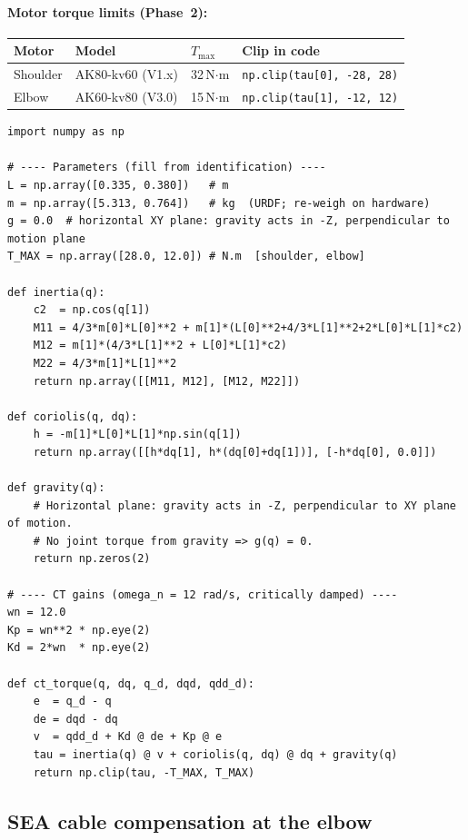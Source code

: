 \documentclass[11pt,a4paper]{article}
\begin{document}
\paragraph{Motor torque limits (Phase~2):}
\begin{center}\small
\begin{tabular}{llll}
\toprule
Motor & Model & $T_{\max}$ & Clip in code \\
\midrule
Shoulder & AK80-kv60 (V1.x) & 32\,N$\cdot$m & \texttt{np.clip(tau[0], -28, 28)} \\
Elbow    & AK60-kv80 (V3.0) & 15\,N$\cdot$m & \texttt{np.clip(tau[1], -12, 12)} \\
\bottomrule
\end{tabular}
\end{center}

\begin{lstlisting}[caption={Computed Torque implementation (Phase~2 arm).}]
import numpy as np

# ---- Parameters (fill from identification) ----
L = np.array([0.335, 0.380])   # m
m = np.array([5.313, 0.764])   # kg  (URDF; re-weigh on hardware)
g = 0.0  # horizontal XY plane: gravity acts in -Z, perpendicular to motion plane
T_MAX = np.array([28.0, 12.0]) # N.m  [shoulder, elbow]

def inertia(q):
    c2  = np.cos(q[1])
    M11 = 4/3*m[0]*L[0]**2 + m[1]*(L[0]**2+4/3*L[1]**2+2*L[0]*L[1]*c2)
    M12 = m[1]*(4/3*L[1]**2 + L[0]*L[1]*c2)
    M22 = 4/3*m[1]*L[1]**2
    return np.array([[M11, M12], [M12, M22]])

def coriolis(q, dq):
    h = -m[1]*L[0]*L[1]*np.sin(q[1])
    return np.array([[h*dq[1], h*(dq[0]+dq[1])], [-h*dq[0], 0.0]])

def gravity(q):
    # Horizontal plane: gravity acts in -Z, perpendicular to XY plane of motion.
    # No joint torque from gravity => g(q) = 0.
    return np.zeros(2)

# ---- CT gains (omega_n = 12 rad/s, critically damped) ----
wn = 12.0
Kp = wn**2 * np.eye(2)
Kd = 2*wn  * np.eye(2)

def ct_torque(q, dq, q_d, dqd, qdd_d):
    e  = q_d - q
    de = dqd - dq
    v  = qdd_d + Kd @ de + Kp @ e
    tau = inertia(q) @ v + coriolis(q, dq) @ dq + gravity(q)
    return np.clip(tau, -T_MAX, T_MAX)
\end{lstlisting}

\subsection{SEA cable compensation at the elbow}
\label{sec:sea}
\end{document}
